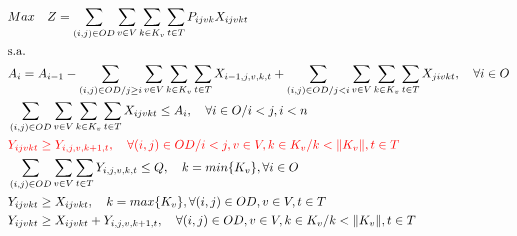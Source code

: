 \allowdisplaybreaks
\begin{align}
	 & Max \quad Z = \sum_{(i,j)\in OD} \sum_{v\in V} \sum_{k\in K_v} \sum_{t\in T} P_{ijvk} X_{ijvkt}                                                                                                                \label{eq: m1_fo}                                                             \\
	 & \text{s.a.}  \notag                                                                                                                                                                                                                                                                          \\
	 & A_{i} = A_{i-1} - \sum_{(i,j) \in OD/j \geq i} \sum_{v\in V} \sum_{k\in K_v}\sum_{t\in T}X_{i-1,j,v,k,t} + \sum_{(i,j) \in OD/j<i}\sum_{v\in V} \sum_{k\in K_v}\sum_{t\in T}X_{jivkt}, \quad \forall i \in O  \label{eq: m1_disponi}                                                         \\
	 & \sum_{(i,j) \in OD}\sum_{v\in V} \sum_{k\in K_v}\sum_{t\in T} X_{ijvkt} \leq A_{i} , \quad \forall i \in O /i<j, i < n                                                                                        \label{eq: m1_cap_assig}                                                       \\
	 & \textcolor{red}{ Y_{ijvkt} \geq Y_{i,j,v,k+1,t},  \quad \forall (i,j) \in OD / i < j, v \in V, k \in K_v / k < \lVert K_v \rVert , t \in T }                                                                  \label{eq: m1_jerar_class}                                                     \\   %
	 & \sum_{(i,j) \in OD}\sum_{v\in V}\sum_{t\in T} Y_{i,j,v,k,t} \leq Q, \quad  k = min\{K_v\}, \forall i \in O                                                                                                    \label{eq: m1_cap_autho_1er_class}                                             \\
	 & Y_{ijvkt} \geq  X_{ijvkt},  \quad k = max\{K_v\}, \forall(i,j) \in OD ,v \in V, t \in T                                                                                                                       \label{eq: m1_autho_mayor_assig_1er_class}                                     \\
	 & Y_{ijvkt} \geq  X_{ijvkt} + Y_{i,j,v,k + 1,t} , \quad \forall(i,j) \in OD, v \in V, k \in K_v / k < \lVert K_v \rVert , t \in T                                                                               \label{eq: m1_autho_mayor_assig_mas_autho}                                     \\

\end{align}
